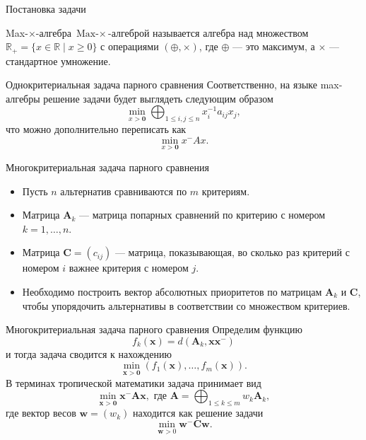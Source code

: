 \documentclass[11pt]{beamer}
\begin{document}
\begin{frame}{Постановка задачи}
  \begin{block}{Max-$\times$-алгебра}
    $\text{Max-}\times$-алгеброй называется алгебра над множеством $\mathbb{R}_{+}=\{x \in \mathbb{R} \mid x \geq 0\}$ с операциями ${(\oplus, \times)}$, где $\oplus$ --- это максимум, а $\times$ --- стандартное умножение.
  \end{block}

	\begin{block}{Однокритериальная задача парного сравнения}
  Соответственно, на языке max-алгебры решение задачи будет выглядеть следующим образом
  \[
    \min _{x>\mathbf{0}} \bigoplus_{1 \leq i, j \leq n} x_{i}^{-1} a_{i j} x_{j},
  \]
  что можно дополнительно переписать как
  \[
    \min _{x>\mathbf{0}} x^{-} A x.
  \]
  \end{block}
\end{frame}
\begin{frame}{Многокритериальная задача парного сравнения}
	\begin{itemize}
		\item 
		Пусть $n$ альтернатив сравниваются по $m$ критериям.
		
		\item
		Матрица $\boldsymbol{A}_k$ --- матрица попарных сравнений по критерию с номером $k = 1, \dots, n$.
		
		\item
		Матрица $\boldsymbol{C} = (c_{ij})$ --- матрица, показывающая, во сколько раз критерий с номером $i$ важнее критерия с номером $j$. 
		
		\item
		Необходимо построить вектор абсолютных приоритетов по матрицам $\boldsymbol{A}_k$ и $\boldsymbol{C}$, чтобы упорядочить альтернативы в соответствии со множеством критериев.
	\end{itemize}
\end{frame}
\begin{frame}{Многокритериальная задача парного сравнения}
		Определим функцию
		$$
		f_{k}(\boldsymbol{x})=d\left(\boldsymbol{A}_{k}, \boldsymbol{x} \boldsymbol{x}^{-}\right)	
		$$ и тогда задача сводится к нахождению
		$$
		\min _{\boldsymbol{x}>\mathbf{0}}\left(f_{1}(\boldsymbol{x}), \ldots, f_{m}(\boldsymbol{x})\right).
		$$
		В терминах тропической математики задача принимает вид
		$$
		\min _{\boldsymbol{x}>\mathbf{0}} \boldsymbol{x}^{-} \boldsymbol{A} \boldsymbol{x},  \text { где }  \boldsymbol{A}=\bigoplus_{1 \leq k \leq m} w_{k} \boldsymbol{A}_{k},
		$$
		где вектор весов $\boldsymbol{w}=\left(w_{k}\right)$ находится как решение задачи
		$$
		\min _{\boldsymbol{w}>0} \boldsymbol{w}^{-} \boldsymbol{C} \boldsymbol{w}.
		$$
\end{frame}
\end{document}
